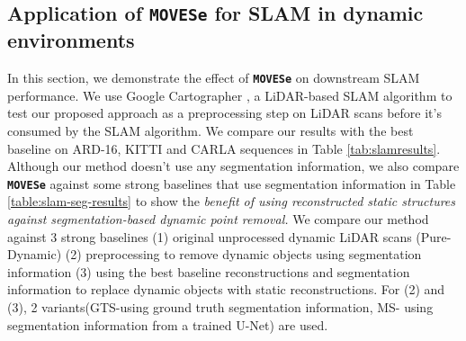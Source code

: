 \documentclass[10pt,twocolumn,letterpaper]{article}
\newcommand{\dslr}{\texttt{\textbf{MOVESe}}}
\begin{document}
\subsection{Application of \dslr{} for SLAM in dynamic environments}

\label{sec:slamindyenv}
In this section, we demonstrate the effect of \dslr{} on downstream SLAM performance.
We use Google Cartographer \cite{hess2016real}, a LiDAR-based SLAM algorithm to test our proposed approach as a preprocessing step on LiDAR scans before it's consumed by the SLAM algorithm. We compare our results with the best baseline on ARD-16, KITTI and CARLA sequences in Table 
\ref{tab:slamresults}.\\
Although our method doesn't use any segmentation information, we also compare \dslr{} against some strong baselines that use segmentation information in Table \ref{table:slam-seg-results} to show the \textit{benefit of using reconstructed static structures against segmentation-based dynamic point removal.} 
We compare our method against 3 strong baselines (1) original unprocessed dynamic LiDAR scans (Pure-Dynamic) (2) preprocessing to remove dynamic objects using segmentation information 
(3) using the best baseline reconstructions and segmentation information to replace dynamic objects with static reconstructions. \cite{kumar2021dslr}
For (2) and (3), 2 variants(GTS-using ground truth segmentation information, MS- using segmentation information from a trained U-Net) are used.
\end{document}
